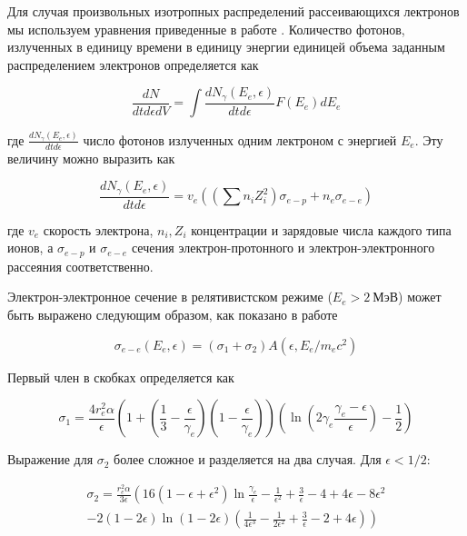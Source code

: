 Для случая произвольных изотропных распределений рассеивающихся лектронов мы используем уравнения приведенные в работе \cite{Baring1999}. Количество фотонов, излученных в единицу времени в единицу энергии единицей объема заданным распределением электронов определяется как

\begin{equation}
	\frac{dN}{dt d\epsilon dV} = \int\frac{dN_{\gamma}\left(E_e, \epsilon\right)}{dt d\epsilon} F(E_e) dE_e
\end{equation}

где $\frac{dN_{\gamma}\left(E_e, \epsilon\right)}{dt d\epsilon}$ число фотонов излученных одним лектроном с энергией $E_e$. Эту величину можно выразить как

\begin{equation}
	\frac{dN_{\gamma}\left(E_e, \epsilon\right)}{dt d\epsilon} = v_e \left(\left(\sum n_i Z_i^2\right)\sigma_{e-p} + n_e\sigma_{e-e}\right)
\end{equation}

где $v_e$ скорость электрона, $n_i, Z_i$ концентрации и зарядовые числа каждого типа ионов, а $\sigma_{e-p}$ и $\sigma_{e-e}$ сечения электрон-протонного и электрон-электронного рассеяния соответственно.

Электрон-электронное сечение в релятивистском режиме ($E_e > 2~\text{МэВ}$) может быть выражено следующим образом, как показано в работе \cite{BaierJETP1967}

\begin{equation}
\sigma_{e-e}(E_e,\epsilon) = \left(\sigma_1 + \sigma_2\right)A\left(\epsilon, E_e/m_e c^2\right)
\end{equation}

Первый член в скобках определяется как

\begin{equation}\label{sigma1}
	\sigma_1 = \frac{4 r_e^2 \alpha}{\epsilon}\left(1+\left(\frac{1}{3}-\frac{\epsilon}{\gamma_e}\right)\left(1-\frac{\epsilon}{\gamma_e}\right)\right)\left(\ln\left(2\gamma_e\frac{\gamma_e - \epsilon}{\epsilon}\right)-\frac{1}{2}\right)
\end{equation}

Выражение для $\sigma_2$ более сложное и разделяется на два случая. Для $\epsilon < 1/2$:

\begin{equation}
	\begin{split}
		\sigma_2 = \frac{r_e^2\alpha}{3\epsilon} \left( 16 \left( 1-\epsilon+\epsilon^2 \right) \ln\frac{\gamma_e}{\epsilon}-\frac{1}{\epsilon^2}+\frac{3}{\epsilon}-4+4\epsilon-8\epsilon^2 \right. \\ \left. - 2\left( 1-2\epsilon \right) \ln \left( 1-2\epsilon \right) \left( \frac{1}{4\epsilon^3}-\frac{1}{2\epsilon^2}+\frac{3}{\epsilon}-2+4\epsilon \right) \right)
	\end{split}
\end{equation}

